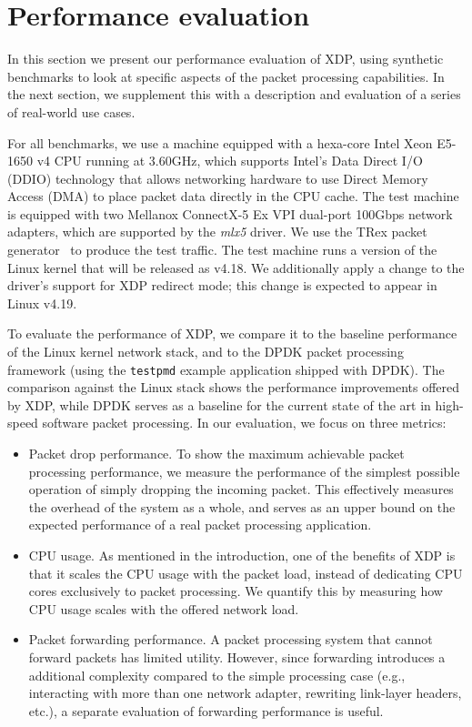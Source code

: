 \documentclass[10pt,sigconf]{acmart}
\begin{document}
\section{Performance evaluation}
\label{sec:perf-eval}
In this section we present our performance evaluation of XDP, using synthetic
benchmarks to look at specific aspects of the packet processing capabilities. In
the next section, we supplement this with a description and evaluation of a
series of real-world use cases.

For all benchmarks, we use a machine equipped with a hexa-core Intel Xeon
E5-1650 v4 CPU running at 3.60GHz, which supports Intel's Data Direct I/O (DDIO)
technology that allows networking hardware to use Direct Memory Access (DMA) to
place packet data directly in the CPU cache. The test machine is equipped with
two Mellanox ConnectX-5 Ex VPI dual-port 100Gbps network adapters, which are
supported by the \emph{mlx5} driver. We use the TRex packet
generator~\cite{cisco18:_trex_traff_gener} to produce the test traffic. The test
machine runs a version of the Linux kernel that will be released as v4.18. We
additionally apply a change to the driver's support for XDP redirect mode; this
change is expected to appear in Linux v4.19.


To evaluate the performance of XDP, we compare it to the baseline performance of
the Linux kernel network stack, and to the DPDK packet processing framework
(using the \texttt{testpmd} example application shipped with DPDK). The
comparison against the Linux stack shows the performance improvements offered by
XDP, while DPDK serves as a baseline for the current state of the art in
high-speed software packet processing. In our evaluation, we focus on three
metrics:

\begin{itemize}
\item Packet drop performance. To show the maximum achievable packet processing
  performance, we measure the performance of the simplest possible operation of
  simply dropping the incoming packet. This effectively measures the overhead of
  the system as a whole, and serves as an upper bound on the expected
  performance of a real packet processing application.

\item CPU usage. As mentioned in the introduction, one of the benefits of XDP is
  that it scales the CPU usage with the packet load, instead of dedicating CPU
  cores exclusively to packet processing. We quantify this by measuring how CPU
  usage scales with the offered network load.

\item Packet forwarding performance. A packet processing system that cannot
  forward packets has limited utility. However, since forwarding introduces a
  additional complexity compared to the simple processing case (e.g.,
  interacting with more than one network adapter, rewriting link-layer headers,
  etc.), a separate evaluation of forwarding performance is useful.
\end{itemize}
\end{document}
